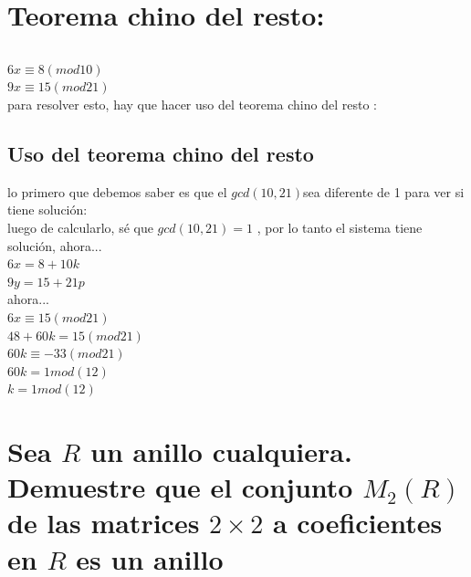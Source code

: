 \documentclass[10pt,a4paper]{article} %
\begin{document}
    \section{Teorema chino del resto:}
        \subsection{}
        $ 6x \equiv 8(mod10)  $
        \\$ 9x \equiv 15(mod21)  $
        \\ para resolver esto, hay que hacer uso del teorema chino del resto :

        \subsection{Uso del teorema chino del resto}
        lo primero que debemos saber es que el $ gcd(10,21)  $sea diferente de 1 para ver si tiene solución:
        \\ luego de calcularlo, sé que $ gcd(10,21) =1   $ , por lo tanto el sistema tiene solución, ahora...
        \\
        $ 6x = 8 + 10k  $
        \\ $ 9y = 15 + 21p  $
        \\ ahora...
        \\ $ 6x \equiv 15(mod21)  $
        \\ $ 48 + 60k = 15(mod21)  $
        \\ $ 60k \equiv -33(mod21)  $
        \\ $ 60k = 1 mod(12)  $
        \\ $ k = 1 mod(12)  $
        \\

    \section{}

    \section{Sea $ R  $  un anillo cualquiera. Demuestre que el conjunto $ M_2
    (R)  $  de las matrices $ 2 \times  2  $  a coeficientes en $ R  $  es un
    anillo}
\end{document}

